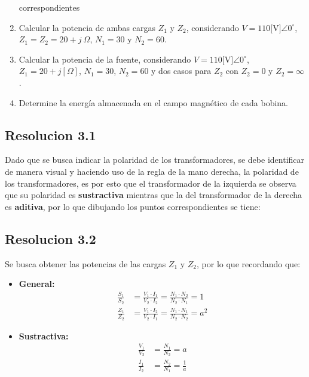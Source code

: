 \documentclass[
  11pt,
  letterpaper,
   addpoints,
   answers
  ]{exam}
\begin{document}
\begin{questions}
\begin{enumerate}
    correspondientes
    \item Calcular la potencia de ambas cargas \( Z_1 \) y \( Z_2 \), considerando \( V = 110\text{[V]}\angle 0^{\circ} \), \( Z_1 = Z_2 = 20 + j\ \Omega \), \( N_1 = 30 \) y \( N_2 = 60 \).
    \item  Calcular la potencia de la fuente, considerando \( V = 110\text{[V]}\angle 0^\circ \), \( Z_1 = 20 + j[ \Omega] \), \( N_1 = 30 \), \( N_2 = 60 \) y dos casos para \( Z_2 \) con \( Z_2 = 0 \) y \( Z_2 = \infty \).
    \item Determine la energía almacenada en el campo magnético de cada bobina.
\end{enumerate}

\begin{solution}
    \subsection*{Resolucion 3.1}
    Dado que se busca indicar la polaridad de los transformadores, se debe identificar de manera visual y haciendo uso de la regla de la mano derecha, la polaridad de los transformadores, es por esto que el transformador de la izquierda se observa que su polaridad es \textbf{sustractiva} mientras que la del transformador de la derecha es \textbf{aditiva}, por lo que dibujando los puntos correspondientes se tiene:
    \subsection*{Resolucion 3.2}
    Se busca obtener las potencias de las cargas $Z_{1}$ y $Z_{2}$, por lo que recordando que:
    
\begin{itemize}
    \item \textbf{General:}
    \begin{align}
    \frac{S_1}{S_2} &= \frac{V_1 \cdot I_1}{V_2 \cdot I_2} = \frac{N_1 \cdot N_2}{N_2 \cdot N_1} = 1 \\
    \frac{Z_1}{Z_2} &= \frac{V_1 \cdot I_2}{V_2 \cdot I_1} = \frac{N_1 \cdot N_1}{N_2 \cdot N_2} = a^2
    \end{align}

    \item \textbf{Sustractiva:}
    \begin{align}
    \frac{V_1}{V_2} &= \frac{N_1}{N_2} = a \\
    \frac{I_1}{I_2} &= \frac{N_2}{N_1} = \frac{1}{a}
    \end{align}


\end{itemize}
\end{solution}
\end{questions}
\end{document}
